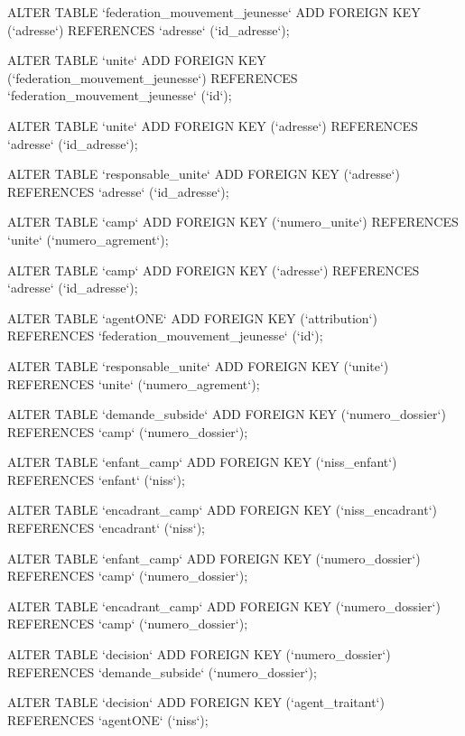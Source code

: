 ALTER TABLE `federation_mouvement_jeunesse` ADD FOREIGN KEY (`adresse`) REFERENCES `adresse` (`id_adresse`);

ALTER TABLE `unite` ADD FOREIGN KEY (`federation_mouvement_jeunesse`) REFERENCES `federation_mouvement_jeunesse` (`id`);

ALTER TABLE `unite` ADD FOREIGN KEY (`adresse`) REFERENCES `adresse` (`id_adresse`);

ALTER TABLE `responsable_unite` ADD FOREIGN KEY (`adresse`) REFERENCES `adresse` (`id_adresse`);

ALTER TABLE `camp` ADD FOREIGN KEY (`numero_unite`) REFERENCES `unite` (`numero_agrement`);

ALTER TABLE `camp` ADD FOREIGN KEY (`adresse`) REFERENCES `adresse` (`id_adresse`);

ALTER TABLE `agentONE` ADD FOREIGN KEY (`attribution`) REFERENCES `federation_mouvement_jeunesse` (`id`);

ALTER TABLE `responsable_unite` ADD FOREIGN KEY (`unite`) REFERENCES `unite` (`numero_agrement`);

ALTER TABLE `demande_subside` ADD FOREIGN KEY (`numero_dossier`) REFERENCES `camp` (`numero_dossier`);

ALTER TABLE `enfant_camp` ADD FOREIGN KEY (`niss_enfant`) REFERENCES `enfant` (`niss`);

ALTER TABLE `encadrant_camp` ADD FOREIGN KEY (`niss_encadrant`) REFERENCES `encadrant` (`niss`);

ALTER TABLE `enfant_camp` ADD FOREIGN KEY (`numero_dossier`) REFERENCES `camp` (`numero_dossier`);

ALTER TABLE `encadrant_camp` ADD FOREIGN KEY (`numero_dossier`) REFERENCES `camp` (`numero_dossier`);

ALTER TABLE `decision` ADD FOREIGN KEY (`numero_dossier`) REFERENCES `demande_subside` (`numero_dossier`);

ALTER TABLE `decision` ADD FOREIGN KEY (`agent_traitant`) REFERENCES `agentONE` (`niss`);
